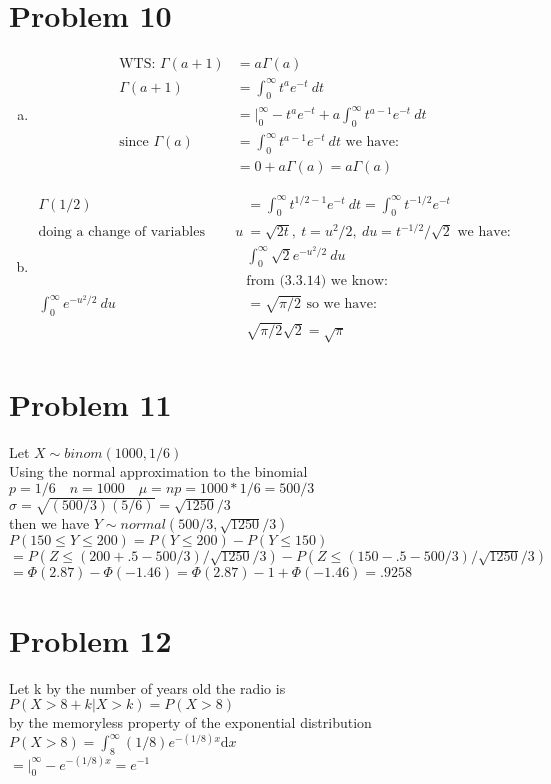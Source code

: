 \documentclass{article}
\newcommand{\dx}{\mathrm{d}x}
\begin{document}
\begin{flushleft}
\section*{Problem 10}
\begin{enumerate}[(a)]
\item
\begin{align*}
\text{WTS: } \Gamma(a+1)&=a \Gamma(a)\\
\Gamma(a+1)&=\int_{0}^{\infty}t^ae^{-t} \ dt\\
&=\bigg|_{0}^{\infty}-t^a e^{-t}+a\int_{0}^{\infty}t^{a-1}e^{-t} \ dt\\
\text{since } \Gamma(a)&=\int_{0}^{\infty}t^{a-1}e^{-t} \ dt \text{ we have:}\\
&=0+a\Gamma(a) =a\Gamma(a)
\end{align*}
\item 
\begin{align*}
 \Gamma(1/2)&=\int_{0}^{\infty}t^{1/2-1}e^{-t} \ dt=\int_{0}^{\infty}t^{-1/2}e^{-t}\\
\text{doing a change of variables where } u&=\sqrt{2t}, \ t=u^2/2, \ du= t^{-1/2}/\sqrt{2} \text{ we have:}\\
&\int_{0}^{\infty}\sqrt{2}e^{-u^2/2} \ du\\
&\text{from (3.3.14) we know:}\\
\int_{0}^{\infty}e^{-u^2/2} \ du&=\sqrt{\pi/2} \text{ so we have:}\\
&\sqrt{\pi/2}\sqrt{2}=\sqrt{\pi}
\end{align*} 
\end{enumerate}
\pagebreak
\section*{Problem 11}
Let $X\sim binom(1000,1/6)$\\
Using the normal approximation to the binomial\\
$p=1/6 \quad n=1000 \quad \mu =np=1000*1/6=500/3$\\
$\sigma=\sqrt{(500/3)(5/6)}=\sqrt{1250}/3$\\
then we have $Y\sim normal(500/3,\sqrt{1250}/3)$\\
$P(150 \leq Y\leq 200)=P(Y\leq 200)-P(Y\leq 150)$\\
$=P(Z \leq (200+.5-500/3)/\sqrt{1250}/3)-P(Z \leq (150-.5-500/3)/\sqrt{1250}/3)$\\
$=\Phi(2.87)-\Phi(-1.46)=\Phi(2.87)-1+\Phi(-1.46)=.9258$\\
\section*{Problem 12}
Let k by the number of years old the radio is\\
$P(X>8+k|X>k)=P(X>8)$ \\
by the memoryless property of the exponential distribution\medbreak
$P(X>8)=\int_{8}^{\infty}(1/8)e^{-(1/8)x}\dx$\\
$=\bigg|_{0}^{\infty}-e^{-(1/8)x}=e^{-1}$


\end{flushleft}
\end{document}

